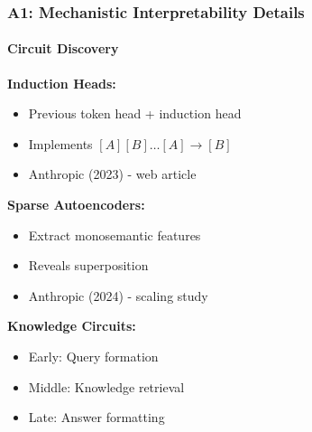\documentclass[10pt,aspectratio=169]{beamer}
\begin{document}

\begin{frame}
\frametitle{A1: Mechanistic Interpretability Details}
\framesubtitle{Circuit Discovery}

\textbf{Induction Heads:}
\begin{itemize}
    \item Previous token head + induction head
    \item Implements $[A][B] \ldots [A] \rightarrow [B]$
    \item Anthropic (2023) - web article
\end{itemize}

\vspace{0.5cm}
\textbf{Sparse Autoencoders:}
\begin{itemize}
    \item Extract monosemantic features
    \item Reveals superposition
    \item Anthropic (2024) - scaling study
\end{itemize}

\vspace{0.5cm}
\textbf{Knowledge Circuits:}
\begin{itemize}
    \item Early: Query formation
    \item Middle: Knowledge retrieval
    \item Late: Answer formatting
\end{itemize}
\end{frame}
\end{document}

